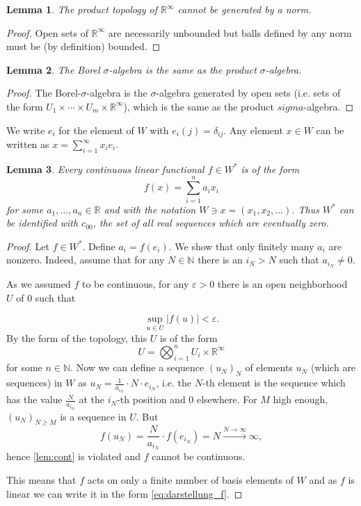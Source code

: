 \documentclass{scrartcl}
\newtheorem{lemma}{Lemma}
\theoremstyle{definition}
\theoremstyle{remark}
\newcommand{\eps}{\varepsilon}
\newcommand{\N}{\mathbb N}
\newcommand{\R}{\mathbb R}
\begin{document}
\begin{lemma}
The product topology of $\R^\infty$ cannot be generated by a norm. 
\end{lemma}
\begin{proof}
Open sets of $\R^\infty$ are necessarily unbounded but balls defined by any norm must be (by definition) bounded.
\end{proof}
\begin{lemma}
The Borel $\sigma$-algebra is the same as the product $\sigma$-algebra.
\end{lemma}
\begin{proof}
The Borel-$\sigma$-algebra is the $\sigma$-algebra generated by open sets (i.e. sets of the form $U_1\times\cdots\times U_m\times \R^\infty$), which is the same as the product $sigma$-algebra.
\end{proof}
We write $e_i$ for the element of $W$ with $e_i(j) = \delta_{ij}$. Any element $x\in W$ can be written as $x = \sum_{i=1}^\infty x_i e_i$.
\begin{lemma}
Every continuous linear functional $f\in W^*$ is of the form 
\begin{equation}f(x) = \sum_{i=1}^n a_i x_i \label{eq:darstellung_f} \end{equation}
for some $a_1,\ldots, a_n\in\R$ and with the notation $W \ni x = (x_1, x_2,\ldots)$. Thus $W^*$ can be identified with $c_{00}$, the set of all real sequences which are eventually zero.
\end{lemma}
\begin{proof}
Let $f\in W^*$. Define $a_i = f(e_i)$. We show that only finitely many $a_i$ are nonzero. Indeed, assume that for any $N\in \N$ there is an $i_N > N$ such that $a_{i_N} \neq 0$.

As we assumed $f$ to be continuous, for any $\eps > 0$ there is an open neighborhood $U$ of $0$ such that

 \begin{equation}
\sup_{u\in U} |f(u)| < \eps.  \label{lem:cont}
 \end{equation} 
 By the form of the topology, this $U$ is of the form
\[ U =  \bigotimes_{i=1}^n U_i \times \R^\infty \]
for some $n\in \N$. Now we can define a sequence $(u_N)_N$ of elements $u_N$ (which are sequences) in $W$ as $u_N = \frac{1}{a_{i_N}}\cdot N\cdot e_{i_N }$, i.e. the $N$-th element is the sequence which has the value $\frac{N}{a_{i_N}}$ at the $i_N$-th position and $0$ elsewhere. For $M$ high enough, $(u_N)_{N\geq M}$ is a sequence in $U$. But
\[ f(u_N) = \frac{N}{a_{i_N}}\cdot f(e_{i_N}) = N \xrightarrow{N\to\infty} \infty,\]
hence \eqref{lem:cont} is violated and $f$ cannot be continuous.

This means that $f$ acts on only a finite number of basis elements of $W$ and as $f$ is linear we can write it in the form \eqref{eq:darstellung_f}.
\end{proof}
\end{document}
